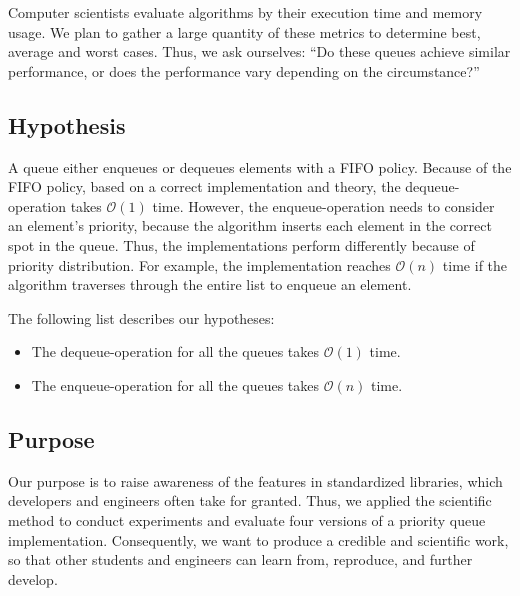 \documentclass[a4paper,11pt]{kth-mag}
\newcommand*{\skippara}{\par\vspace{\baselineskip} \noindent}
\begin{document}
\skippara
Computer scientists evaluate algorithms by their execution time and memory usage.
We plan to gather a large quantity of these metrics to determine best, average and worst cases.
Thus, we ask ourselves: ``Do these queues achieve similar performance, or does the performance vary depending on the circumstance?''


\clearpage
\subsection{Hypothesis}
A queue either enqueues or dequeues elements with a FIFO policy.
Because of the FIFO policy, based on a correct implementation and theory, the dequeue-operation takes $\mathcal{O}(1)$ time.
However, the enqueue-operation needs to consider an element's priority, because the algorithm inserts each element in the correct spot in the queue.
Thus, the implementations perform differently because of priority distribution.
For example, the implementation reaches $\mathcal{O}(n)$ time if the algorithm traverses through the entire list to enqueue an element.

\skippara The following list describes our hypotheses:
\begin{itemize}
    \item The dequeue-operation for all the queues takes $\mathcal{O}(1)$ time.
    \item The enqueue-operation for all the queues takes $\mathcal{O}(n)$ time.
\end{itemize}

\subsection{Purpose}\label{sec:purpose}
\skippara Our purpose is to raise awareness of the features in standardized libraries, which developers and engineers often take for granted.
Thus, we applied the scientific method to conduct experiments and evaluate four versions of a priority queue implementation.
Consequently, we want to produce a credible and scientific work, so that other students and engineers can learn from, reproduce, and further develop.
\end{document}
